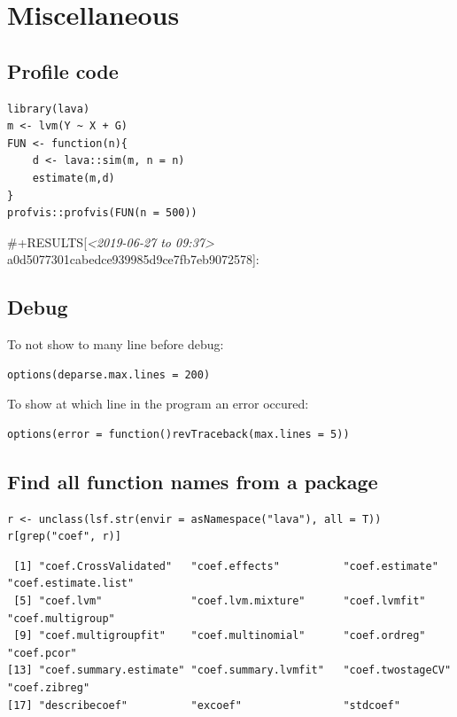 \documentclass{article}
\begin{document}
\section{Miscellaneous}
\label{sec:orgf8b7371}
\subsection{Profile code}
\label{sec:org6c8362e}

\lstset{language=r,label= ,caption= ,captionpos=b,numbers=none}
\begin{lstlisting}
library(lava)
m <- lvm(Y ~ X + G)
FUN <- function(n){
	d <- lava::sim(m, n = n)
	estimate(m,d)
}
profvis::profvis(FUN(n = 500))
\end{lstlisting}

\#+RESULTS[\textit{<2019-06-27 to 09:37> } a0d5077301cabedce939985d9ce7fb7eb9072578]:
\subsection{Debug}
\label{sec:org69b3ac9}
To not show to many line before debug:
\lstset{language=r,label= ,caption= ,captionpos=b,numbers=none}
\begin{lstlisting}
options(deparse.max.lines = 200)
\end{lstlisting}

To show at which line in the program an error occured:
\lstset{language=r,label= ,caption= ,captionpos=b,numbers=none}
\begin{lstlisting}
options(error = function()revTraceback(max.lines = 5))
\end{lstlisting}

\subsection{Find all function names from a package}
\label{sec:orgaa30b2b}
\lstset{language=r,label= ,caption= ,captionpos=b,numbers=none}
\begin{lstlisting}
r <- unclass(lsf.str(envir = asNamespace("lava"), all = T))
r[grep("coef", r)]
\end{lstlisting}

\begin{verbatim}
 [1] "coef.CrossValidated"   "coef.effects"          "coef.estimate"         "coef.estimate.list"   
 [5] "coef.lvm"              "coef.lvm.mixture"      "coef.lvmfit"           "coef.multigroup"      
 [9] "coef.multigroupfit"    "coef.multinomial"      "coef.ordreg"           "coef.pcor"            
[13] "coef.summary.estimate" "coef.summary.lvmfit"   "coef.twostageCV"       "coef.zibreg"          
[17] "describecoef"          "excoef"                "stdcoef"
\end{verbatim}
\end{document}
